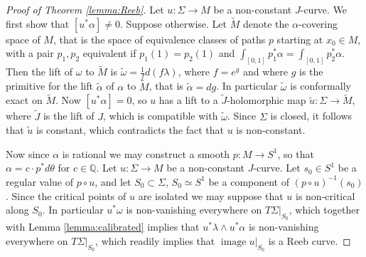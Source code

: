 \documentclass{amsart}
\numberwithin{equation}{section}
\newtheorem{lemma}[equation]{Lemma}
\theoremstyle{definition}
\theoremstyle{remark}
\DeclareMathOperator{\image}{\mathrm{image}}
\DeclareMathOperator{\lcs}{lcs}
\begin{document}
\begin{proof} [Proof of Theorem \ref{lemma:Reeb}]
Let $u: \Sigma \to M$ be a non-constant $J$-curve. We first show that $[u ^{*} \alpha] \neq 0$.  Suppose otherwise. Let $\widetilde{M}$ denote the  $\alpha$-covering space of $M$, that is the space of equivalence classes of paths $p$ starting at $x _{0} \in M $, with a pair $p _{1}, p _{2}  $ equivalent if $p _{1} (1) = p _{2} (1)  $ and $ \int _{[0,1]} p _{1} ^{*} \alpha  =  \int _{[0,1]} p _{2} ^{*} \alpha$.
Then the lift of $\omega$ to $\widetilde{M} $ is $\widetilde{\omega}= \frac{1}{f} d (f\lambda) $,
where $f= e ^{g} $ and where $g$ is the primitive for the lift $\widetilde{\alpha} $ of $\alpha$ to $\widetilde{M} $, that is $\widetilde{\alpha} =dg $.
In particular $\widetilde{\omega} $ is conformally exact on $\widetilde{M}$. Now $[u ^{*} \alpha] = 0$,  so $u$ has a lift to a $\widetilde{J} $-holomorphic map $\widetilde{u}: \Sigma \to \widetilde{M}  $,
where $\widetilde{J} $ is the lift of $J$, which is compatible with $\widetilde{\omega} $.
Since $\Sigma$ is closed, it follows that $\widetilde{u} $ is constant, which contradicts the fact that ${u} $ is non-constant. 

Now since $\alpha$ is rational we may construct a smooth $p: M \to S ^{1} $,   so that $\alpha=c \cdot p ^{*} d\theta $ for $c \in \mathbb{Q}$. 
Let $u: \Sigma \to M$ be a non-constant $J$-curve. Let $s _{0}  \in S ^{1}  $ be a regular value of $p \circ u$, and let $S _{0}   \subset \Sigma $, $S _{0}  \simeq S ^{1}  $ be a component of $(p \circ u) ^{-1} (s _{0} ) $. Since the critical points of $u$ are isolated we may suppose that $u$ is non-critical along $S _{0} $. In particular $u ^{*} \omega $ is non-vanishing everywhere on $T\Sigma| _{S _{0}} $, which together with Lemma \ref{lemma:calibrated} implies that $u ^{*} \lambda \wedge u ^{*} \alpha  $ is non-vanishing everywhere on $T\Sigma| _{S _{0}} $, which readily implies that $\image u| _{S _{0}} $ is a Reeb curve.


\end{proof}
\end{document}
